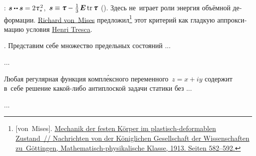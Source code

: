 \begin{otherlanguage}{russian}
:
${\stressdeviator \dotdotp \stressdeviator = 2 \mathtau_{*}^{\hspace{.25ex}2}}$, ${\, \stressdeviator \equiv \cauchystress - \frac{1}{3} \hspace{.25ex} \bm{E} \operatorname{tr} \cauchystress}$ ().
Здесь не~играет роли энергия объёмной деформации.
\href{https://en.wikipedia.org/wiki/Richard_von_Mises}{Richard von~Mises} предложил\footnote{[von~Mises]. \href{https://gdz.sub.uni-goettingen.de/id/PPN252457811_1913?tify=\%7B"pages":\%5B602\%5D,"view":"info"\%7D}{Mechanik der festen K\"{o}rper im plastisch-deformablen Zustand~// Nachrichten von der K\"{o}niglichen Gesellschaft der Wissenschaften zu~Göttingen, Mathematisch-physikalische Klasse, 1913. Seiten 582\hbox{--}592.}}\hspace{-0.25ex}
этот критерий как гладкую аппроксимацию условия \href{https://en.wikipedia.org/wiki/Henri_Tresca}{Henri Tresca}.

.
Представим себе множество предельных состояний ...

...



\end{otherlanguage}



\begin{otherlanguage}{russian}

Любая регулярная функция компл\'{е}ксного переменного~${z = x + iy}$ содержит в~себе решение какой\hbox{-}либо антиплоской задачи статики без ...

...



\end{otherlanguage}


